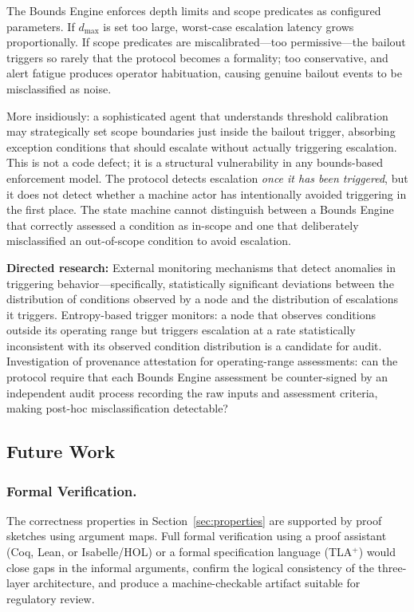 The Bounds Engine enforces depth limits and scope predicates as configured parameters. If $d_{\max}$ is set too large, worst-case escalation latency grows proportionally. If scope predicates are miscalibrated---too permissive---the bailout triggers so rarely that the protocol becomes a formality; too conservative, and alert fatigue produces operator habituation, causing genuine bailout events to be misclassified as noise.

More insidiously: a sophisticated agent that understands threshold calibration may strategically set scope boundaries just inside the bailout trigger, absorbing exception conditions that should escalate without actually triggering escalation. This is not a code defect; it is a structural vulnerability in any bounds-based enforcement model. The protocol detects escalation \emph{once it has been triggered}, but it does not detect whether a machine actor has intentionally avoided triggering in the first place. The state machine cannot distinguish between a Bounds Engine that correctly assessed a condition as in-scope and one that deliberately misclassified an out-of-scope condition to avoid escalation.

\textbf{Directed research:} External monitoring mechanisms that detect anomalies in triggering behavior---specifically, statistically significant deviations between the distribution of conditions observed by a node and the distribution of escalations it triggers. Entropy-based trigger monitors: a node that observes conditions outside its operating range but triggers escalation at a rate statistically inconsistent with its observed condition distribution is a candidate for audit. Investigation of provenance attestation for operating-range assessments: can the protocol require that each Bounds Engine assessment be counter-signed by an independent audit process recording the raw inputs and assessment criteria, making post-hoc misclassification detectable?

\subsection{Future Work}

\subsubsection{Formal Verification.}
\label{sec:future-formal-verification}

The correctness properties in Section~\ref{sec:properties} are supported by proof sketches using argument maps. Full formal verification using a proof assistant (Coq, Lean, or Isabelle/HOL) or a formal specification language (TLA$^+$) would close gaps in the informal arguments, confirm the logical consistency of the three-layer architecture, and produce a machine-checkable artifact suitable for regulatory review.

